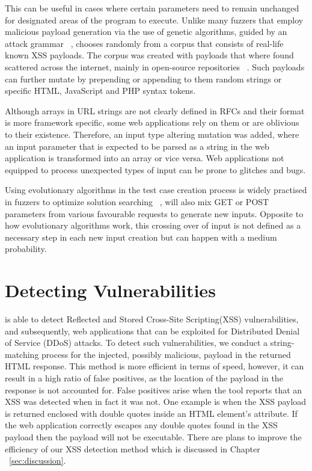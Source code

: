 This can be useful in cases where certain parameters need to remain unchanged for designated areas of the program to execute. Unlike many fuzzers that employ malicious payload generation via the use of genetic algorithms, guided by an attack grammar ~\cite{duchene2014kameleonfuzz}, \pname{} chooses randomly from a corpus that consists of real-life known XSS payloads. The corpus was created with payloads that where found scattered across the internet, mainly in open-source repositories ~\cite{seclist,xsspayloadfirst,xsspayloadsecond}. Such payloads can further mutate by prepending or appending to them random strings or specific HTML, JavaScript and PHP syntax tokens.

Although arrays in URL strings are not clearly defined in RFCs and their format is more framework specific, some web applications rely on them or are oblivious to their existence. Therefore, an input type altering mutation was added, where an input parameter that is
expected to be parsed as a string in the web application is transformed into an array or vice versa. Web applications not equipped to process unexpected types of input can be prone to glitches and bugs.

Using evolutionary algorithms in the test case creation process is widely practised in fuzzers
to optimize solution searching ~\cite{seal2016Genetic}, \pname{} will also mix GET or POST parameters from various favourable requests to generate new inputs. Opposite to how evolutionary algorithms work, this crossing over of input is not defined as a necessary step in each new input creation but can happen with a medium probability.

\section{Detecting Vulnerabilities}
\pname{} is able to detect Reflected and Stored Cross-Site Scripting(XSS) vulnerabilities, and subsequently, web applications that can be exploited for Distributed Denial of Service (DDoS) attacks. To detect such vulnerabilities, we conduct a string-matching process for the injected, possibly malicious, payload in the returned HTML response. This method is more efficient in terms of speed, however, it can result in a high ratio of false positives, as the location of the payload in the response is not accounted for. False positives arise when the tool reports that an XSS was detected when in fact it was not. One example is when the XSS payload is returned enclosed with double quotes inside an HTML element's attribute. If the web application correctly escapes any double quotes found in the XSS payload then the payload will not be executable. There are plans to improve the efficiency of our XSS detection method which is discussed in Chapter ~\ref{sec:discussion}.

